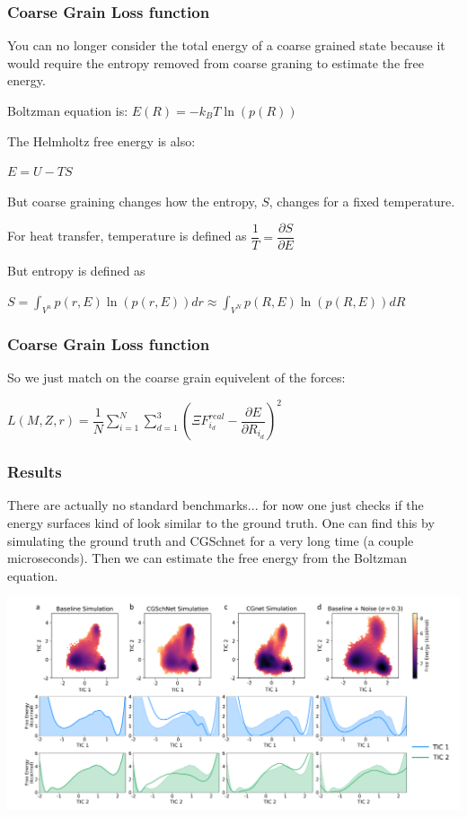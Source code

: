 \documentclass{beamer}
\begin{document}
\begin{frame}
  \frametitle{Coarse Grain Loss function}
  You can no longer consider the total energy of a coarse grained state because it would require the entropy removed from coarse graning to estimate the free energy.\\
  \begin{center}
    Boltzman equation is: $E(R) = -k_BT \ln(p(R))$
  \end{center}
  The Helmholtz free energy is also:
  \begin{center}
    $E = U - TS$
  \end{center}
  But coarse graining changes how the entropy, $S$, changes for a fixed temperature.
  \begin{center}
    For heat transfer, temperature is defined as $\dfrac{1}{T} = \dfrac{\partial S}{\partial E}$
  \end{center}
  But entropy is defined as
  \begin{center}
    $S = \int_{V^n}p(r, E)\ln(p(r, E))dr \approx \int_{V^N}p(R, E)\ln(p(R, E))dR$
  \end{center}
\end{frame}
\begin{frame}
  \frametitle{Coarse Grain Loss function}
  So we just match on the coarse grain equivelent of the forces:
  \begin{center}
    $L(M, Z, r)= \dfrac{1}{N} \sum^N_{i=1} \sum^3_{d=1} ( \Xi F^{real}_{i_d} - \dfrac{\partial E}{\partial R_{i_d}} )^2$
  \end{center}
\end{frame}
\begin{frame}
  \frametitle{Results}
  There are actually no standard benchmarks... for now one just checks if the energy surfaces kind of look similar to the ground truth. One can find this by simulating the ground truth and CGSchnet for a very long time (a couple microseconds). Then we can estimate the free energy from the Boltzman equation.
  \begin{center}
    \includegraphics[width=0.8\linewidth]{./chignolin_results.png}
  \end{center}
\end{frame}
\end{document}
